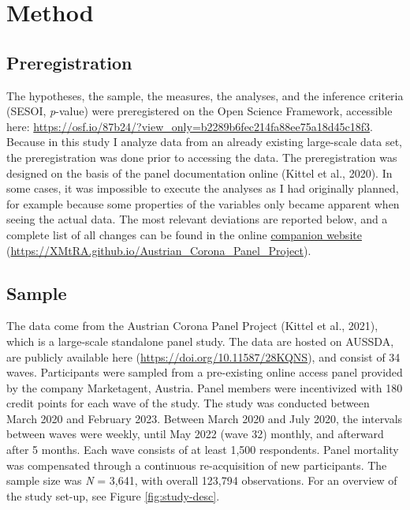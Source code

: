\documentclass[
  man,mask,floatsintext]{apa7}
\begin{document}
\hypertarget{method}{%
\section{Method}\label{method}}

\hypertarget{preregistration}{%
\subsection{Preregistration}\label{preregistration}}

The hypotheses, the sample, the measures, the analyses, and the inference criteria (SESOI, \emph{p}-value) were preregistered on the Open Science Framework, accessible here: \url{https://osf.io/87b24/?view_only=b2289b6fec214fa88ee75a18d45c18f3}.
Because in this study I analyze data from an already existing large-scale data set, the preregistration was done prior to accessing the data.
The preregistration was designed on the basis of the panel documentation online (Kittel et al., 2020).
In some cases, it was impossible to execute the analyses as I had originally planned, for example because some properties of the variables only became apparent when seeing the actual data.
The most relevant deviations are reported below, and a complete list of all changes can be found in the online \href{https://XMtRA.github.io/Austrian_Corona_Panel_Project}{companion website} (\url{https://XMtRA.github.io/Austrian_Corona_Panel_Project}).

\hypertarget{sample}{%
\subsection{Sample}\label{sample}}

The data come from the Austrian Corona Panel Project (Kittel et al., 2021), which is a large-scale standalone panel study.
The data are hosted on AUSSDA, are publicly available here (\url{https://doi.org/10.11587/28KQNS}), and consist of 34 waves.
Participants were sampled from a pre-existing online access panel provided by the company Marketagent, Austria.
Panel members were incentivized with 180 credit points for each wave of the study.
The study was conducted between March 2020 and February 2023.
Between March 2020 and July 2020, the intervals between waves were weekly, until May 2022 (wave 32) monthly, and afterward after 5 months.
Each wave consists of at least 1,500 respondents.
Panel mortality was compensated through a continuous re-acquisition of new participants.
The sample size was \emph{N} = 3,641, with overall 123,794 observations.
For an overview of the study set-up, see Figure \ref{fig:study-desc}.
\end{document}
